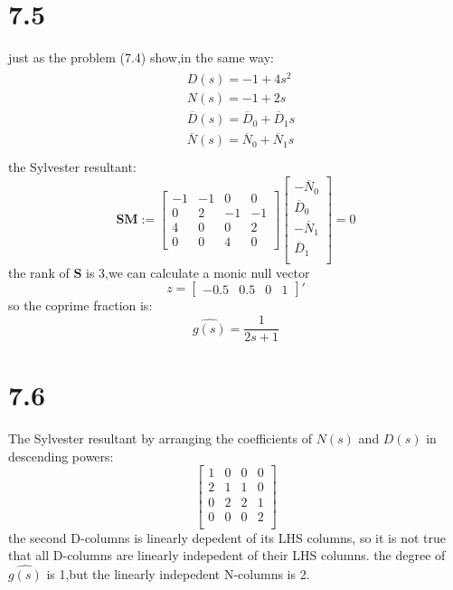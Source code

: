 \documentclass{article}
\begin{document}
\section*{7.5}
just as the problem (7.4) show,in the same way:
\[
\begin{aligned}
\begin{split}
&D(s)=-1+4s^2\\
&N(s)=-1+2s\\
&\overline{D}(s)=\overline{D}_0+\overline{D}_1s\\
&\overline{N}(s)=\overline{N}_0+\overline{N}_1s\\
\end{split}
\end{aligned}
\]
the Sylvester resultant:
\[
\textbf{SM}:=
\left[
    \begin{array}{cccc}
    -1 & -1 & 0 & 0 \\
    0  & 2  & -1& -1 \\
    4  & 0  & 0 & 2 \\
    0  & 0  & 4 & 0
    \end{array}
\right]
\left[
    \begin{array}{c}
        -\overline{N}_0\\
        \overline{D}_0\\
        -\overline{N}_1\\
        \overline{D}_1\\
    \end{array}
\right]=0
\]
the rank of $\textbf{S}$ is 3,we can calculate a monic null vector
\[z=
\left[
    \begin{array}{cccc}
        -0.5 & 0.5 & 0 & 1
    \end{array}
\right]'
\]
so the coprime fraction is:
\[
   \hat{g(s)}=\frac{1}{2s+1}
\]

\section*{7.6}
The Sylvester resultant by arranging the coefficients of $N(s)$ and $D(s)$ in descending powers:
\[
    \left[
        \begin{array}{cccc}
        1 & 0 & 0 & 0\\
        2 & 1 & 1 & 0\\
        0 & 2 & 2 & 1\\
        0 & 0 & 0 & 2\\
        \end{array}
    \right]    
\]
the second D-columns is linearly depedent of its LHS columns, so it is not true that all D-columns are linearly indepedent of their LHS columns.
the degree of $\hat{g(s)}$ is 1,but the linearly indepedent N-columns is 2.
\end{document}
